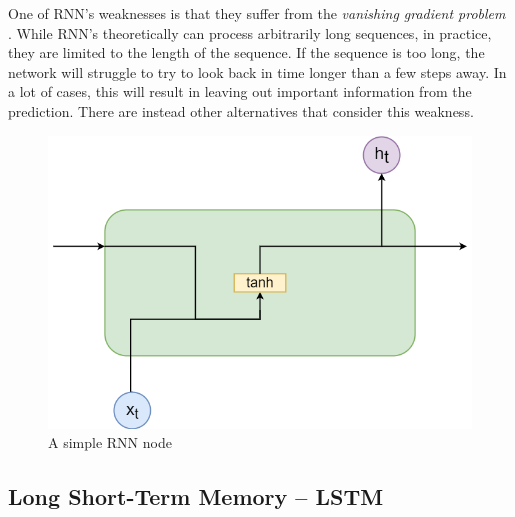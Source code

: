 \documentclass[nofilelist]{cslthse-msc}
\begin{document}
One of RNN's weaknesses is that they suffer from the \textit{vanishing gradient problem} \citep{hochreiter1998}. While RNN's theoretically can process arbitrarily long sequences, in practice, they are limited to the length of the sequence. If the sequence is too long, the network will struggle to try to look back in time longer than a few steps away. In a lot of cases, this will result in leaving out important information from the prediction. There are instead other alternatives that consider this weakness. 



 
 \begin{figure}[!ht]
    \centering
    \includegraphics[scale=0.5]{msccls/explanatory_images/rnn.png}
    \caption{A simple RNN node}
    \label{fig:rnn_node}
\end{figure}



\subsection{Long Short-Term Memory -- LSTM}
\end{document}

